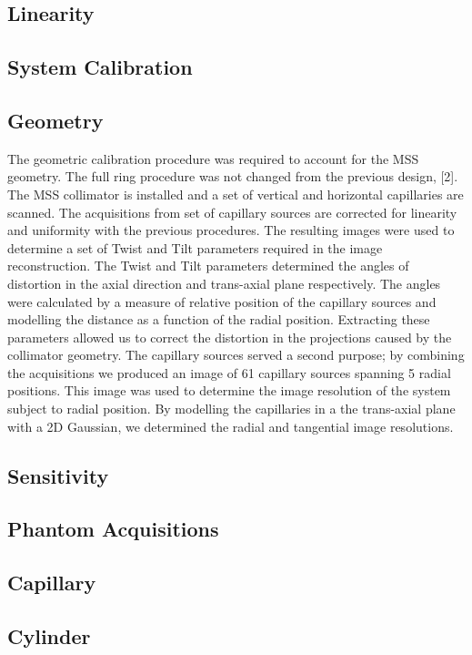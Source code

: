 \subsection{Linearity} 
\subsection{System Calibration}
\subsection{Geometry}
The geometric calibration procedure was required to account
for the MSS geometry. The full ring procedure was not
changed from the previous design, [2]. The MSS collimator
is installed and a set of vertical and horizontal capillaries
are scanned. The acquisitions from set of capillary sources
are corrected for linearity and uniformity with the previous
procedures. The resulting images were used to determine
a set of Twist and Tilt parameters required in the image
reconstruction. The Twist and Tilt parameters determined the
angles of distortion in the axial direction and trans-axial
plane respectively. The angles were calculated by a measure
of relative position of the capillary sources and modelling
the distance as a function of the radial position. Extracting
these parameters allowed us to correct the distortion in the
projections caused by the collimator geometry.
The capillary sources served a second purpose; by combining
the acquisitions we produced an image of 61 capillary
sources spanning 5 radial positions. This image was used to
determine the image resolution of the system subject to radial
position. By modelling the capillaries in a the trans-axial plane
with a 2D Gaussian, we determined the radial and tangential
image resolutions.

\subsection{Sensitivity}
\subsection{Phantom Acquisitions}
\subsection{Capillary}
\subsection{Cylinder}
